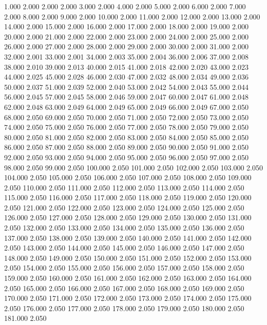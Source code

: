 1.000 2.000 
2.000 2.000 
3.000 2.000 
4.000 2.000 
5.000 2.000 
6.000 2.000 
7.000 2.000 
8.000 2.000 
9.000 2.000 
10.000 2.000 
11.000 2.000 
12.000 2.000 
13.000 2.000 
14.000 2.000 
15.000 2.000 
16.000 2.000 
17.000 2.000 
18.000 2.000 
19.000 2.000 
20.000 2.000 
21.000 2.000 
22.000 2.000 
23.000 2.000 
24.000 2.000 
25.000 2.000 
26.000 2.000 
27.000 2.000 
28.000 2.000 
29.000 2.000 
30.000 2.000 
31.000 2.000 
32.000 2.001 
33.000 2.001 
34.000 2.003 
35.000 2.004 
36.000 2.006 
37.000 2.008 
38.000 2.010 
39.000 2.013 
40.000 2.015 
41.000 2.018 
42.000 2.020 
43.000 2.023 
44.000 2.025 
45.000 2.028 
46.000 2.030 
47.000 2.032 
48.000 2.034 
49.000 2.036 
50.000 2.037 
51.000 2.039 
52.000 2.040 
53.000 2.042 
54.000 2.043 
55.000 2.044 
56.000 2.045 
57.000 2.045 
58.000 2.046 
59.000 2.047 
60.000 2.047 
61.000 2.048 
62.000 2.048 
63.000 2.049 
64.000 2.049 
65.000 2.049 
66.000 2.049 
67.000 2.050 
68.000 2.050 
69.000 2.050 
70.000 2.050 
71.000 2.050 
72.000 2.050 
73.000 2.050 
74.000 2.050 
75.000 2.050 
76.000 2.050 
77.000 2.050 
78.000 2.050 
79.000 2.050 
80.000 2.050 
81.000 2.050 
82.000 2.050 
83.000 2.050 
84.000 2.050 
85.000 2.050 
86.000 2.050 
87.000 2.050 
88.000 2.050 
89.000 2.050 
90.000 2.050 
91.000 2.050 
92.000 2.050 
93.000 2.050 
94.000 2.050 
95.000 2.050 
96.000 2.050 
97.000 2.050 
98.000 2.050 
99.000 2.050 
100.000 2.050 
101.000 2.050 
102.000 2.050 
103.000 2.050 
104.000 2.050 
105.000 2.050 
106.000 2.050 
107.000 2.050 
108.000 2.050 
109.000 2.050 
110.000 2.050 
111.000 2.050 
112.000 2.050 
113.000 2.050 
114.000 2.050 
115.000 2.050 
116.000 2.050 
117.000 2.050 
118.000 2.050 
119.000 2.050 
120.000 2.050 
121.000 2.050 
122.000 2.050 
123.000 2.050 
124.000 2.050 
125.000 2.050 
126.000 2.050 
127.000 2.050 
128.000 2.050 
129.000 2.050 
130.000 2.050 
131.000 2.050 
132.000 2.050 
133.000 2.050 
134.000 2.050 
135.000 2.050 
136.000 2.050 
137.000 2.050 
138.000 2.050 
139.000 2.050 
140.000 2.050 
141.000 2.050 
142.000 2.050 
143.000 2.050 
144.000 2.050 
145.000 2.050 
146.000 2.050 
147.000 2.050 
148.000 2.050 
149.000 2.050 
150.000 2.050 
151.000 2.050 
152.000 2.050 
153.000 2.050 
154.000 2.050 
155.000 2.050 
156.000 2.050 
157.000 2.050 
158.000 2.050 
159.000 2.050 
160.000 2.050 
161.000 2.050 
162.000 2.050 
163.000 2.050 
164.000 2.050 
165.000 2.050 
166.000 2.050 
167.000 2.050 
168.000 2.050 
169.000 2.050 
170.000 2.050 
171.000 2.050 
172.000 2.050 
173.000 2.050 
174.000 2.050 
175.000 2.050 
176.000 2.050 
177.000 2.050 
178.000 2.050 
179.000 2.050 
180.000 2.050 
181.000 2.050 
